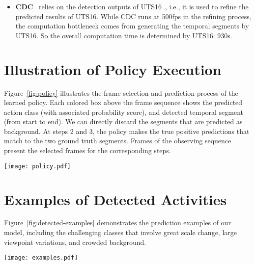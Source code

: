 \documentclass{bmvc2k}
\begin{document}
\begin{itemize}
\item \textbf{CDC}~\cite{DBLP:journals/corr/ShouCZMC17} relies on the detection outputs of UTS16~\cite{uts}, i.e., it is used to refine the predicted results of UTS16. While CDC runs at 500fps in the refining process, the computation bottleneck comes from generating the temporal segments by UTS16. So the overall computation time is determined by UTS16: $930$s.  

\end{itemize}

\section{Illustration of Policy Execution}
\label{sec:policy}

Figure~\ref{fig:policy} illustrates the frame selection and prediction process of the learned policy. Each colored box above the frame sequence shows the predicted action class (with associated probability score), and detected temporal segment (from start to end). We can directly discard the segments that are predicted as background. At steps 2 and 3, the policy makes the true positive predictions that match to the two ground truth segments. Frames of the observing sequence present the selected frames for the corresponding steps.      

\begin{figure*}[h]
\centering
\texttt{[image: policy.pdf]}
\caption {Illustration of the learned policy running for frame selection and activity prediction on THUMOS14.}
\label{fig:policy}
\end{figure*}

\section{Examples of Detected Activities}
\label{sec:examples}

Figure~\ref{fig:detected-examples} demonstrates the prediction examples of our model, including the challenging classes that involve great scale change, large viewpoint variations, and crowded background.     

\begin{figure*}[h]
\centering
\texttt{[image: examples.pdf]}
\caption {Examples of the predicted results on ActivityNet. Each row shows four sampled frames within the temporal extent of a detected activity. Faded frames indicate the frames outside the detected temporal boundary.}
\label{fig:detected-examples}
\end{figure*}
\end{document}
